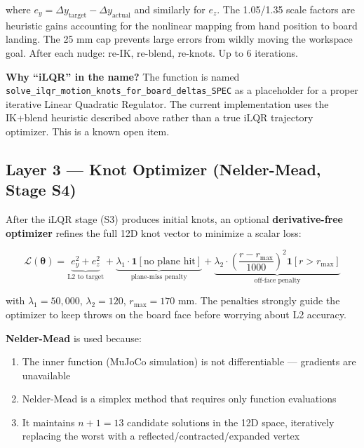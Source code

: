 \documentclass[11pt,letterpaper]{article}
\begin{document}
where $e_y = \Delta y_{\text{target}} - \Delta y_{\text{actual}}$ and similarly for $e_z$. The 1.05/1.35 scale factors are heuristic gains accounting for the nonlinear mapping from hand position to board landing. The 25 mm cap prevents large errors from wildly moving the workspace goal. After each nudge: re-IK, re-blend, re-knots. Up to 6 iterations.

\begin{infobox}
  \textbf{Why ``iLQR'' in the name?} The function is named \texttt{solve\_ilqr\_motion\_knots\_for\_board\_deltas\_SPEC} as a placeholder for a proper iterative Linear Quadratic Regulator. The current implementation uses the IK+blend heuristic described above rather than a true iLQR trajectory optimizer. This is a known open item.
\end{infobox}

\subsection{Layer 3 — Knot Optimizer (Nelder-Mead, Stage S4)}

After the iLQR stage (S3) produces initial knots, an optional \textbf{derivative-free optimizer} refines the full 12D knot vector to minimize a scalar loss:

\begin{equation}
  \mathcal{L}(\bm{\theta}) =
    \underbrace{e_y^2 + e_z^2}_{\text{L2 to target}}
    + \underbrace{\lambda_1 \cdot \mathbf{1}[\text{no plane hit}]}_{\text{plane-miss penalty}}
    + \underbrace{\lambda_2 \cdot \left(\frac{r - r_{\max}}{1000}\right)^2 \mathbf{1}[r > r_{\max}]}_{\text{off-face penalty}}
  \label{eq:knot-loss}
\end{equation}

with $\lambda_1 = 50{,}000$, $\lambda_2 = 120$, $r_{\max} = 170$ mm. The penalties strongly guide the optimizer to keep throws on the board face before worrying about L2 accuracy.

\textbf{Nelder-Mead} is used because:
\begin{enumerate}[nosep]
  \item The inner function (MuJoCo simulation) is not differentiable — gradients are unavailable
  \item Nelder-Mead is a simplex method that requires only function evaluations
  \item It maintains $n+1 = 13$ candidate solutions in the 12D space, iteratively replacing the worst with a reflected/contracted/expanded vertex
\end{enumerate}
\end{document}
